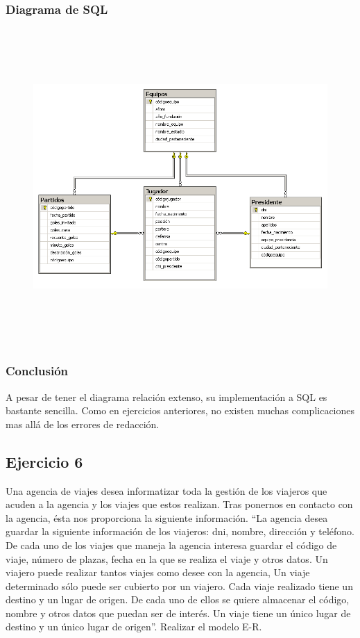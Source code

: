 \documentclass[a4paper, 12pt]{article}
\begin{document}
\begin{justify}
        \subsubsection{Diagrama de SQL}
        \begin{figure}[H]
            \centering
            \includegraphics[width=12cm,height=12cm]{sql5.png}
        \end{figure}
        \subsubsection{Conclusión}
        \justify
        A pesar de tener el diagrama relación extenso, su implementación a SQL es bastante sencilla. Como en ejercicios anteriores, no existen muchas complicaciones mas allá de los errores de redacción.
        \subsection{Ejercicio 6}
        \justify
        Una agencia de viajes desea informatizar toda la gestión de los viajeros que acuden a la agencia y los viajes que estos realizan. Tras ponernos en contacto con la agencia, ésta nos proporciona la siguiente información. ``La agencia 
        desea guardar la siguiente información de los viajeros: dni, nombre, dirección y teléfono. De cada uno de los viajes que maneja la agencia interesa guardar el código de viaje, número de plazas, fecha en la que se realiza el viaje y
        otros datos. Un viajero puede realizar tantos viajes como desee con la agencia, Un viaje determinado sólo puede ser cubierto por un viajero. Cada viaje realizado tiene un destino y un lugar de origen. De cada uno de ellos se quiere almacenar
        el código, nombre y otros datos que puedan ser de interés. Un viaje tiene un único lugar de destino y un único lugar de origen''. Realizar el modelo E-R.

\end{justify}
\end{document}
